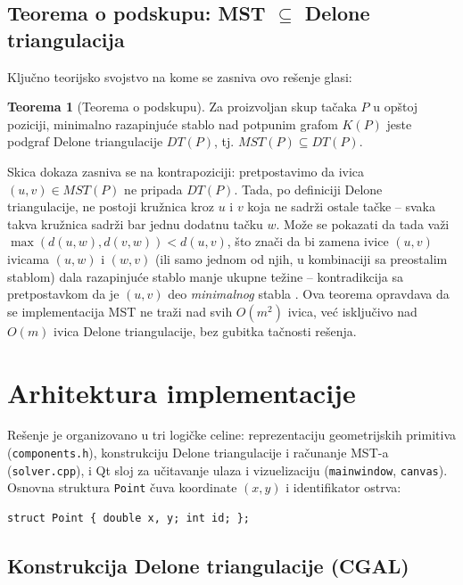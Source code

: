 \documentclass[11pt]{article}
\theoremstyle{definition}
\newtheorem{theorem}{Teorema}[section]
\begin{document}
\subsection{Teorema o podskupu: MST $\subseteq$ Delone triangulacija}

Ključno teorijsko svojstvo na kome se zasniva ovo rešenje glasi:

\begin{theorem}[Teorema o podskupu]
\label{def:teorema}
Za proizvoljan skup tačaka $P$ u opštoj poziciji, minimalno razapinjuće stablo nad potpunim  grafom $K(P)$ jeste podgraf Delone triangulacije $DT(P)$, tj. $MST(P) \subseteq DT(P)$.
\end{theorem}
Skica dokaza zasniva se na kontrapoziciji: pretpostavimo da ivica $(u,v) \in MST(P)$ ne pripada $DT(P)$. Tada, po definiciji Delone triangulacije, ne postoji kružnica kroz $u$ i $v$ koja ne sadrži ostale tačke -- svaka takva kružnica sadrži bar jednu dodatnu tačku $w$. Može se pokazati da tada važi $\max(d(u,w), d(v,w)) < d(u,v)$, što znači da bi zamena ivice $(u,v)$ ivicama $(u,w)$ i $(w,v)$ (ili samo jednom od njih, u kombinaciji sa preostalim stablom) dala razapinjuće stablo manje ukupne težine -- kontradikcija sa pretpostavkom da je $(u,v)$ deo \emph{minimalnog} stabla \cite[Teorema 6.9]{preparata_shamos}. Ova teorema opravdava da se implementacija MST ne traži nad svih $O(m^2)$ ivica, već isključivo nad $O(m)$ ivica Delone triangulacije, bez gubitka tačnosti rešenja.

\section{Arhitektura implementacije}

Rešenje je organizovano u tri logičke celine: reprezentaciju geometrijskih primitiva (\texttt{components.h}), konstrukciju Delone triangulacije i računanje MST-a (\texttt{solver.cpp}), i Qt sloj za učitavanje ulaza i vizuelizaciju (\texttt{mainwindow}, \texttt{canvas}). 
\\
Osnovna struktura \texttt{Point} čuva koordinate $(x, y)$ i identifikator ostrva:
\begin{verbatim}
struct Point { double x, y; int id; };
\end{verbatim}

\subsection{Konstrukcija Delone triangulacije (CGAL)}
\end{document}
